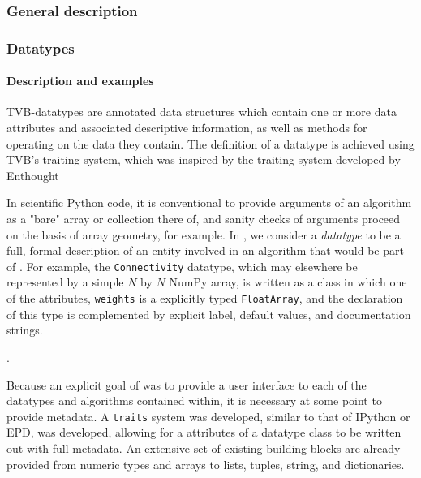 	\subsubsection{General description}

	\subsubsection{\TVB Datatypes}

\paragraph{Description and examples}

 TVB-datatypes are annotated data structures which
contain one or more data attributes and associated descriptive information, as
well as methods for operating on the data they contain. The definition of a
datatype is achieved using TVB's traiting system, which was inspired by the
traiting system developed by Enthought \cite{Enthought_2001} 



In scientific Python code, it is conventional to provide arguments
of an algorithm as a "bare" array or collection there of, and sanity
checks of arguments proceed on the basis of array geometry, for example.
In \TVB, we consider a \textit{datatype} to be a full, formal description of 
an entity involved in an algorithm that would be part of \TVB. 
For example, the \texttt{Connectivity} datatype, which may elsewhere
be represented by a simple $N$ by $N$ NumPy array, is written as a class
in which one of the attributes, \texttt{weights} is a explicitly typed 
\texttt{FloatArray}, and the declaration of this type is complemented by
explicit label, default values, and documentation strings. 

.

Because an explicit goal of \TVB was to provide a user interface to each of the
datatypes and algorithms contained within, it is necessary at some point to
provide metadata. A \texttt{traits} system was developed, similar to that of
IPython or EPD, was developed, allowing for a attributes of a datatype class to
be written out with full metadata. An extensive set of existing building 
blocks are already provided from numeric types and arrays to lists, tuples, 
string, and dictionaries.

